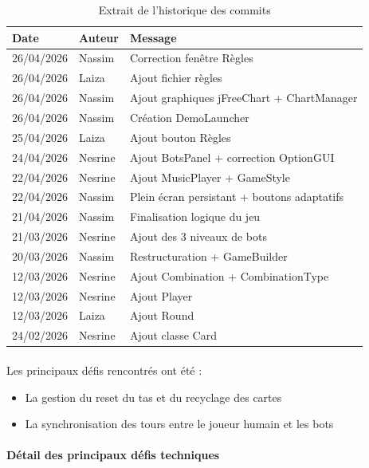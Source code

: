 \begin{table}[h!]
\centering
\begin{tabular}{|l|l|l|}
\hline
\textbf{Date} & \textbf{Auteur} & \textbf{Message} \\
\hline
26/04/2026 & Nassim & Correction fenêtre Règles \\
\hline
26/04/2026 & Laiza & Ajout fichier règles \\
\hline
26/04/2026 & Nassim & Ajout graphiques jFreeChart + ChartManager \\
\hline
26/04/2026 & Nassim & Création DemoLauncher \\
\hline
25/04/2026 & Laiza & Ajout bouton Règles \\
\hline
24/04/2026 & Nesrine & Ajout BotsPanel + correction OptionGUI \\
\hline
22/04/2026 & Nesrine & Ajout MusicPlayer + GameStyle \\
\hline
22/04/2026 & Nassim & Plein écran persistant + boutons adaptatifs \\
\hline
21/04/2026 & Nassim & Finalisation logique du jeu \\
\hline
21/03/2026 & Nesrine & Ajout des 3 niveaux de bots \\
\hline
20/03/2026 & Nassim & Restructuration + GameBuilder \\
\hline
12/03/2026 & Nesrine & Ajout Combination + CombinationType \\
\hline
12/03/2026 & Nesrine & Ajout Player \\
\hline
12/03/2026 & Laiza & Ajout Round \\
\hline
24/02/2026 & Nesrine & Ajout classe Card \\
\hline
\end{tabular}
\caption{Extrait de l'historique des commits}
\label{tab:commits}
\end{table}

\paragraph{} Les principaux défis rencontrés ont été :
\begin{itemize}
\item La gestion du reset du tas et du recyclage des cartes
\item La synchronisation des tours entre le joueur humain et les bots
\end{itemize}

\paragraph{Détail des principaux défis techniques}

